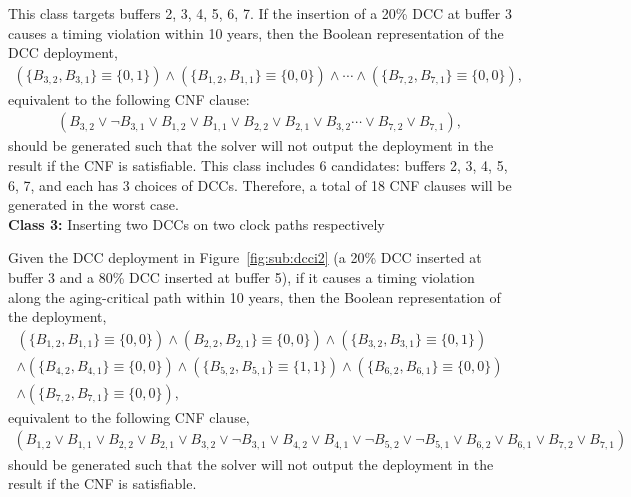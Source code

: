 This class targets buffers 2, 3, 4, 5, 6, 7. If the insertion of a 20\% DCC at buffer 3 causes a timing violation within 10 years, then the Boolean representation of the DCC deployment, 
{\fontsize{9}{10}
\begin{gather*}
	\left(\{B_{3,2}, B_{3,1}\} \equiv \{0, 1\} \right) \land \left( \{B_{1,2}, B_{1,1}\} \equiv \{0, 0\} \right) \land \dotsb 
	\land \left( \{B_{7,2}, B_{7,1}\} \equiv \{0, 0\} \right),
\end{gather*}}equivalent to the following CNF clause:
{\fontsize{9}{10}
\begin{gather*}
	(B_{3,2} \lor \neg B_{3,1} \lor B_{1,2} \lor B_{1,1} \lor B_{2,2} \lor B_{2,1} \lor B_{3,2} \dotsb  
\lor B_{7,2} \lor B_{7,1}),
\end{gather*}}should be generated such that the solver will not output the deployment in the result if the CNF is satisfiable. This class includes 6 candidates: buffers 2, 3, 4, 5, 6, 7, and each has 3 choices of DCCs. Therefore, a total of 18 CNF clauses will be generated in the worst case.\\

\noindent \textbf{Class 3:} Inserting two DCCs on two clock paths respectively

Given the DCC deployment in Figure~\ref{fig:sub:dcci2} (a 20\% DCC inserted at buffer 3 and a 80\% DCC inserted at buffer 5), if it causes a timing violation along the aging-critical path within 10 years, then the Boolean representation of the deployment,
{\fontsize{9}{10}
\begin{gather*}
\left(\{B_{1,2}, B_{1,1}\} \equiv \{0, 0\} \right) \land \left(B_{2,2}, B_{2,1}\} \equiv \{0, 0\} \right) \land \left(\{B_{3,2}, B_{3,1}\} \equiv \{0, 1\} \right) \\ 
\land \left( \{B_{4,2}, B_{4,1}\} \equiv \{0, 0\} \right) \land \left(\{B_{5,2}, B_{5,1}\} \equiv \{1, 1\} \right) \land \left( \{B_{6,2}, B_{6,1}\} \equiv \{0, 0\} \right)\\
\land \left( \{B_{7,2}, B_{7,1}\} \equiv \{0, 0\} \right),
\end{gather*}}equivalent to the following CNF clause,
{\fontsize{9}{10}
\begin{gather*}
(B_{1,2} \lor B_{1,1} \lor B_{2,2} \lor B_{2,1} \lor B_{3,2}  \lor \neg B_{3,1} \lor B_{4,2} \lor B_{4,1} \lor \neg B_{5,2} \lor \neg B_{5,1} \lor B_{6,2} \lor B_{6,1} \lor B_{7,2} \lor B_{7,1} )
\end{gather*}}should be generated such that the solver will not output the deployment in the result if the CNF is satisfiable.

